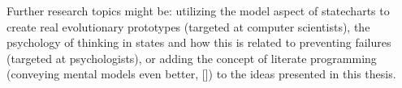 Further research topics might be: utilizing the model aspect of statecharts to create real evolutionary prototypes (targeted at computer scientists), the psychology of thinking in states and how this is related to preventing failures (targeted at psychologists), or adding the concept of literate programming (conveying mental models even better, [\textcite{knuth_literate_1984}]) to the ideas presented in this thesis.






